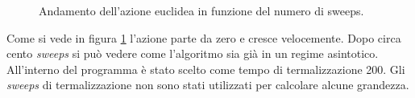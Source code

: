 \begin{figure}[!h]
  \centering
  \caption{\small{Andamento dell'azione euclidea in funzione del numero di sweeps.}}
  \label{fig:initialisation}
\end{figure}
Come si vede in figura \ref{fig:initialisation} l'azione parte da zero e cresce velocemente. Dopo circa cento \emph{sweeps} si può vedere come l'algoritmo sia già in un regime asintotico.
All'interno del programma è stato scelto come tempo di termalizzazione 200. Gli \emph{sweeps} di termalizzazione non sono stati utilizzati per calcolare alcune grandezza.

